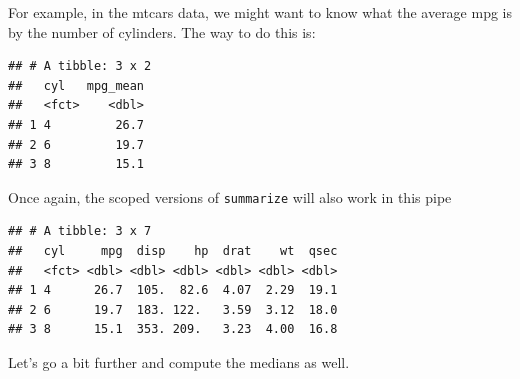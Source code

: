 \documentclass[12pt,letterpaperpaper,openany]{book}
\newenvironment{Shaded}{\begin{snugshade}}{\end{snugshade}}
\newcommand{\DataTypeTok}[1]{\textcolor[rgb]{0.13,0.29,0.53}{#1}}
\newcommand{\KeywordTok}[1]{\textcolor[rgb]{0.13,0.29,0.53}{\textbf{#1}}}
\newcommand{\NormalTok}[1]{#1}
\newcommand{\OperatorTok}[1]{\textcolor[rgb]{0.81,0.36,0.00}{\textbf{#1}}}
\newcommand{\StringTok}[1]{\textcolor[rgb]{0.31,0.60,0.02}{#1}}
\begin{document}
For example, in the mtcars data, we might want to know what the average mpg is by the number of cylinders. The
way to do this is:

\begin{Shaded}
\end{Shaded}

\begin{verbatim}
## # A tibble: 3 x 2
##   cyl   mpg_mean
##   <fct>    <dbl>
## 1 4         26.7
## 2 6         19.7
## 3 8         15.1
\end{verbatim}

Once again, the scoped versions of \texttt{summarize} will also work in this pipe

\begin{Shaded}
\end{Shaded}

\begin{verbatim}
## # A tibble: 3 x 7
##   cyl     mpg  disp    hp  drat    wt  qsec
##   <fct> <dbl> <dbl> <dbl> <dbl> <dbl> <dbl>
## 1 4      26.7  105.  82.6  4.07  2.29  19.1
## 2 6      19.7  183. 122.   3.59  3.12  18.0
## 3 8      15.1  353. 209.   3.23  4.00  16.8
\end{verbatim}

Let's go a bit further and compute the medians as well.

\begin{Shaded}
\end{Shaded}
\end{document}
